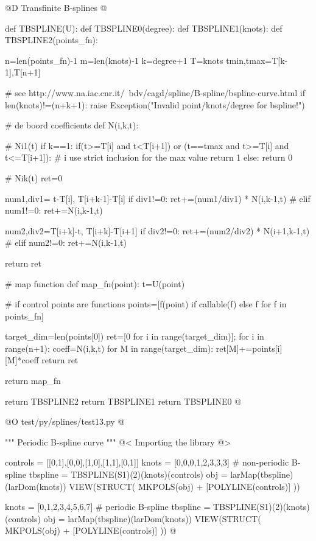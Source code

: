 \documentclass[11pt,oneside]{article}	%
\begin{document}
@D Transfinite B-splines
@{
def TBSPLINE(U):
	def TBSPLINE0(degree):
		def TBSPLINE1(knots):
			def TBSPLINE2(points_fn):
	
				n=len(points_fn)-1
				m=len(knots)-1
				k=degree+1
				T=knots
				tmin,tmax=T[k-1],T[n+1]
	
				# see http://www.na.iac.cnr.it/~bdv/cagd/spline/B-spline/bspline-curve.html
				if len(knots)!=(n+k+1):
					raise Exception("Invalid point/knots/degree for bspline!")
	
				# de boord coefficients
				def N(i,k,t):
	
					# Ni1(t)
					if k==1: 
						if(t>=T[i] and t<T[i+1]) or (t==tmax and t>=T[i] and t<=T[i+1]): 
							# i use strict inclusion for the max value
							return 1
						else:
							return 0
	
					# Nik(t)
					ret=0
	
					num1,div1= t-T[i], T[i+k-1]-T[i]  
					if div1!=0: ret+=(num1/div1) * N(i,k-1,t)
					# elif num1!=0: ret+=N(i,k-1,t)
	
					num2,div2=T[i+k]-t, T[i+k]-T[i+1]
					if div2!=0:  ret+=(num2/div2) * N(i+1,k-1,t)
					# elif num2!=0: ret+=N(i,k-1,t)
	
					return ret
	
				# map function
				def map_fn(point):
					t=U(point)
	
					# if control points are functions
					points=[f(point) if callable(f) else f for f in points_fn]
	
					target_dim=len(points[0])
					ret=[0 for i in range(target_dim)];
					for i in range(n+1):
						coeff=N(i,k,t) 
						for M in range(target_dim):
							ret[M]+=points[i][M]*coeff
					return ret
	
				return map_fn
	
			return TBSPLINE2
		return TBSPLINE1
	return TBSPLINE0
@}


@O test/py/splines/test13.py
@{""" Periodic B-spline curve """
@< Importing the library @>

controls = [[0,1],[0,0],[1,0],[1,1],[0,1]]
knots = [0,0,0,1,2,3,3,3]				# non-periodic B-spline
tbspline = TBSPLINE(S1)(2)(knots)(controls)
obj = larMap(tbspline)(larDom(knots))  
VIEW(STRUCT( MKPOLS(obj) + [POLYLINE(controls)] ))

knots = [0,1,2,3,4,5,6,7]				# periodic B-spline
tbspline = TBSPLINE(S1)(2)(knots)(controls) 	
obj = larMap(tbspline)(larDom(knots))
VIEW(STRUCT( MKPOLS(obj) + [POLYLINE(controls)] ))
@}
\end{document}
